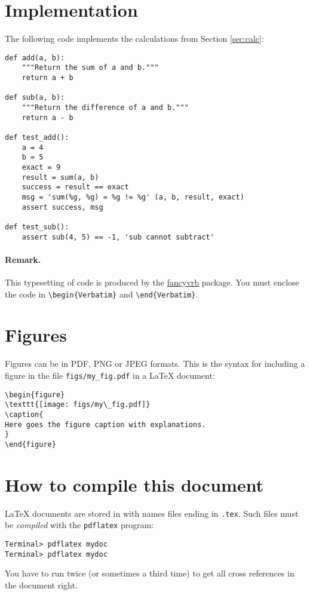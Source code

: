 \documentclass{article}
\begin{document}
\section{Implementation}
\label{sec:py}

The following code implements the calculations from Section \ref{sec:calc}:

\begin{Verbatim}
def add(a, b):
    """Return the sum of a and b."""
    return a + b

def sub(a, b):
    """Return the difference of a and b."""
    return a - b

def test_add():
    a = 4
    b = 5
    exact = 9
    result = sum(a, b)
    success = result == exact
    msg = 'sum(%g, %g) = %g != %g' (a, b, result, exact)
    assert success, msg

def test_sub():
    assert sub(4, 5) == -1, 'sub cannot subtract'
\end{Verbatim}

\paragraph{Remark.}
This typesetting of code is produced by the
\href{http://texdoc.net/texmf-dist/doc/latex/fancyvrb/fancyvrb.pdf}{fancyvrb} package. You must
enclose the code in
\verb!\begin{Verbatim}! and
\verb!\end{Verbatim}!.

\section{Figures}

Figures can be in PDF, PNG or JPEG formats. This is the syntax for
including a figure in the file \verb!figs/my_fig.pdf! in a \LaTeX{}
document:

\begin{Verbatim}
\begin{figure}
\texttt{[image: figs/my\_fig.pdf]}
\caption{
Here goes the figure caption with explanations.
}
\end{figure}
\end{Verbatim}

\appendix
\section{How to compile this document}

LaTeX{} documents are stored in with names files ending in
\texttt{.tex}.
Such files must be \emph{compiled} with the \texttt{pdflatex} program:

\begin{Verbatim}
Terminal> pdflatex mydoc
Terminal> pdflatex mydoc
\end{Verbatim}
You have to run twice (or sometimes a third time) to get all cross
references in the document right.
\end{document}
